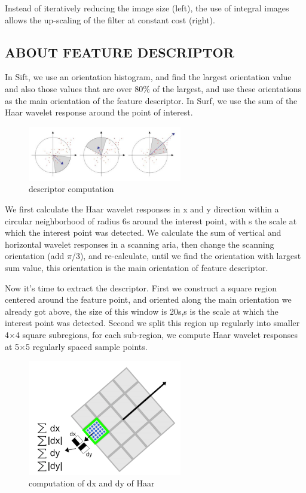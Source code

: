  Instead of iteratively reducing the image size (left), the use of integral images allows the up-scaling of the filter at constant cost (right).\\
 
 \subsection{ABOUT FEATURE DESCRIPTOR}
 In Sift, we use an orientation histogram, and find the largest orientation value and also those values that are over 80\% of the largest, and use these orientations as the main orientation of the feature descriptor. In Surf, we use the sum of the Haar wavelet response around the point of interest.

\begin{figure}[H]
\centering
\includegraphics[width=0.6\textwidth]{img/surf3.jpg}
\caption{descriptor computation }
\label{fig:surf3}
\end{figure}

We first calculate the Haar wavelet responses in x and y direction within a circular neighborhood of radius 6s around the interest point, with s the scale at which the interest point was detected. We calculate the sum of vertical and horizontal wavelet responses in a scanning aria, then change the scanning orientation (add $\pi$/3), and re-calculate, until we find the orientation with largest sum value, this orientation is the main orientation of feature descriptor.

Now it’s time to extract the descriptor. First we construct a square region centered around the feature point, and oriented along the main orientation we already got above, the size of this window is 20s,s is the scale at which the interest point was detected. Second we split this region up regularly into smaller 4$\times$4 square subregions, for each sub-region, we compute Haar wavelet responses at 5$\times$5 regularly spaced sample points.


\begin{figure}[H]
\centering
\includegraphics[width=0.6\textwidth]{img/surf5.png}
\caption{computation of dx and dy of Haar  }
\label{fig:surf5}
\end{figure}

